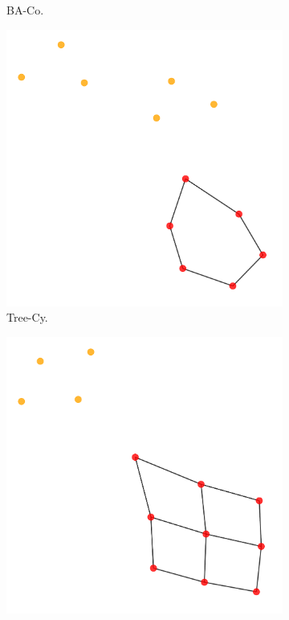 \begin{figure}[h]
\begin{subfigure}[b]{0.15\textwidth}
        \caption{\scriptsize BA-Co.}
        \label{fig:qual_comm}
    \end{subfigure}
    \begin{subfigure}[b]{0.15\textwidth}
        \includegraphics[width=\linewidth]{img/Tree-Cycles/graph_4_explanation.pdf}
        \caption{\scriptsize Tree-Cy.}
        \label{fig:qual_cycle}
    \end{subfigure}
    \begin{subfigure}[b]{0.15\textwidth}
        \includegraphics[width=\linewidth]{img/Tree-Grid/graph_2_explanation.pdf}

\end{subfigure}
\end{figure}
